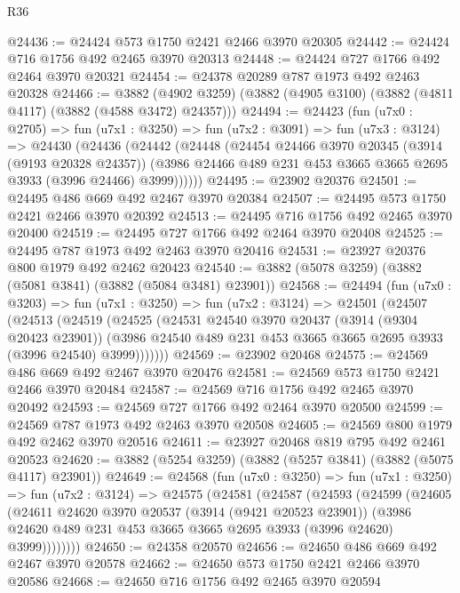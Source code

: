\begin{lexlean}{R36}
\begin{coremodule}
@24436 := @24424 @573 @1750 @2421 @2466 @3970 @20305
@24442 := @24424 @716 @1756 @492 @2465 @3970 @20313
@24448 := @24424 @727 @1766 @492 @2464 @3970 @20321
@24454 := @24378 @20289 @787 @1973 @492 @2463 @20328
@24466 := @3882
    (@4902 @3259)
    (@3882 (@4905 @3100) (@3882 (@4811 @4117) (@3882 (@4588 @3472) @24357)))
@24494 := @24423
    (fun (u7x0 : @2705) =>
    fun (u7x1 : @3250) =>
    fun (u7x2 : @3091) =>
    fun (u7x3 : @3124) =>
    @24430
      (@24436
        (@24442
          (@24448
            (@24454
              @24466
              @3970
              @20345
              (@3914 (@9193 @20328 @24357))
              (@3986 @24466 @489 @231 @453 @3665 @3665 @2695 @3933 (@3996 @24466) @3999))))))
@24495 := @23902 @20376
@24501 := @24495 @486 @669 @492 @2467 @3970 @20384
@24507 := @24495 @573 @1750 @2421 @2466 @3970 @20392
@24513 := @24495 @716 @1756 @492 @2465 @3970 @20400
@24519 := @24495 @727 @1766 @492 @2464 @3970 @20408
@24525 := @24495 @787 @1973 @492 @2463 @3970 @20416
@24531 := @23927 @20376 @800 @1979 @492 @2462 @20423
@24540 := @3882 (@5078 @3259) (@3882 (@5081 @3841) (@3882 (@5084 @3481) @23901))
@24568 := @24494
    (fun (u7x0 : @3203) =>
    fun (u7x1 : @3250) =>
    fun (u7x2 : @3124) =>
    @24501
      (@24507
        (@24513
          (@24519
            (@24525
              (@24531
                @24540
                @3970
                @20437
                (@3914 (@9304 @20423 @23901))
                (@3986 @24540 @489 @231 @453 @3665 @3665 @2695 @3933 (@3996 @24540) @3999)))))))
@24569 := @23902 @20468
@24575 := @24569 @486 @669 @492 @2467 @3970 @20476
@24581 := @24569 @573 @1750 @2421 @2466 @3970 @20484
@24587 := @24569 @716 @1756 @492 @2465 @3970 @20492
@24593 := @24569 @727 @1766 @492 @2464 @3970 @20500
@24599 := @24569 @787 @1973 @492 @2463 @3970 @20508
@24605 := @24569 @800 @1979 @492 @2462 @3970 @20516
@24611 := @23927 @20468 @819 @795 @492 @2461 @20523
@24620 := @3882 (@5254 @3259) (@3882 (@5257 @3841) (@3882 (@5075 @4117) @23901))
@24649 := @24568
    (fun (u7x0 : @3250) =>
    fun (u7x1 : @3250) =>
    fun (u7x2 : @3124) =>
    @24575
      (@24581
        (@24587
          (@24593
            (@24599
              (@24605
                (@24611
                  @24620
                  @3970
                  @20537
                  (@3914 (@9421 @20523 @23901))
                  (@3986 @24620 @489 @231 @453 @3665 @3665 @2695 @3933 (@3996 @24620) @3999))))))))
@24650 := @24358 @20570
@24656 := @24650 @486 @669 @492 @2467 @3970 @20578
@24662 := @24650 @573 @1750 @2421 @2466 @3970 @20586
@24668 := @24650 @716 @1756 @492 @2465 @3970 @20594

\end{coremodule}
\end{lexlean}
